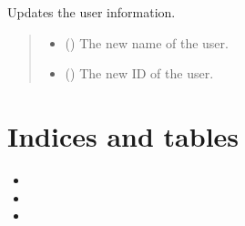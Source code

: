 \documentclass[letterpaper,10pt,english,openany,oneside]{sphinxmanual}
\begin{document}
\begin{fulllineitems}
\begin{fulllineitems}
\end{fulllineitems}


\begin{fulllineitems}
\label{\detokenize{user:user.User.update}}
\pysigstartsignatures
{}
\pysigstopsignatures
\sphinxAtStartPar
Updates the user information.
\begin{quote}\begin{description}
\begin{itemize}
\item {} 
\sphinxAtStartPar
{} (\sphinxstyleliteralemphasis{\sphinxupquote{, }}) \textendash{} The new name of the user.

\item {} 
\sphinxAtStartPar
{} (\sphinxstyleliteralemphasis{\sphinxupquote{, }}) \textendash{} The new ID of the user.

\end{itemize}

\end{description}\end{quote}

\end{fulllineitems}


\end{fulllineitems}



\chapter{Indices and tables}
\label{\detokenize{index:indices-and-tables}}\begin{itemize}
\item {} 
\sphinxAtStartPar
{}

\item {} 
\sphinxAtStartPar
{}

\item {} 
\sphinxAtStartPar
{}

\end{itemize}
\end{document}
